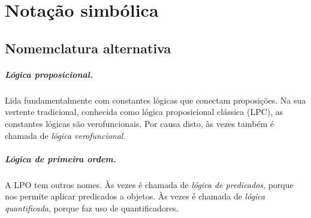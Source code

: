 
\chapter{Notação simbólica}
\label{app.notation}

\section{Nomemclatura alternativa}


\paragraph{Lógica proposicional.} Lida fundamentalmente com constantes lógicas que conectam proposições. Na sua vertente tradicional, conhecida como lógica proposicional clássica (LPC), as constantes lógicas são verofuncionais. Por causa disto, às vezes também é chamada de \emph{lógica verofuncional}.


\paragraph{Lógica de primeira ordem.} A LPO tem outros nomes. Às vezes é chamada de \emph{lógica de predicados}, porque nos permite aplicar predicados a objetos. Às vezes é chamada de \emph{lógica quantificada}, porque faz uso de quantificadores. 

